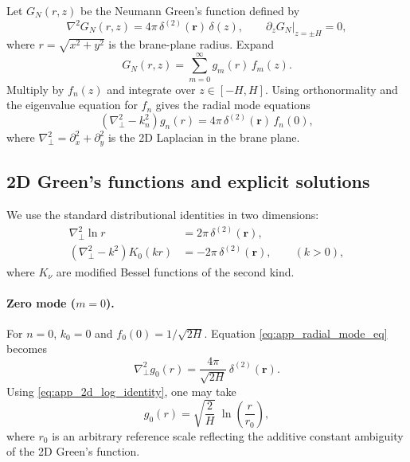 \documentclass[11pt]{article}
\begin{document}
Let $G_N(r,z)$ be the Neumann Green's function defined by
\begin{equation}
  \nabla^2 G_N(r,z) = 4\pi\,\delta^{(2)}(\mathbf{r})\,\delta(z),
  \qquad \partial_z G_N|_{z=\pm H}=0,
\end{equation}
where $r=\sqrt{x^2+y^2}$ is the brane-plane radius.
Expand
\begin{equation}
  G_N(r,z) = \sum_{m=0}^{\infty} g_m(r)\,f_m(z).
  \label{eq:app_G_expansion}
\end{equation}
Multiply by $f_n(z)$ and integrate over $z\in[-H,H]$. Using orthonormality and the eigenvalue
equation for $f_n$ gives the radial mode equations
\begin{equation}
  \left(\nabla_\perp^2 - k_n^2\right) g_n(r)
  = 4\pi\,\delta^{(2)}(\mathbf{r})\,f_n(0),
  \label{eq:app_radial_mode_eq}
\end{equation}
where $\nabla_\perp^2=\partial_x^2+\partial_y^2$ is the 2D Laplacian in the brane plane.

\subsection{2D Green's functions and explicit solutions}

We use the standard distributional identities in two dimensions:
\begin{align}
  \nabla_\perp^2 \ln r &= 2\pi\,\delta^{(2)}(\mathbf{r}),
  \label{eq:app_2d_log_identity}\\
  \left(\nabla_\perp^2 - k^2\right)K_0(k r) &= -2\pi\,\delta^{(2)}(\mathbf{r}),
  \qquad (k>0),
  \label{eq:app_2d_K0_identity}
\end{align}
where $K_\nu$ are modified Bessel functions of the second kind.

\paragraph{Zero mode ($m=0$).}
For $n=0$, $k_0=0$ and $f_0(0)=1/\sqrt{2H}$.  Equation \eqref{eq:app_radial_mode_eq} becomes
\begin{equation}
  \nabla_\perp^2 g_0(r) = \frac{4\pi}{\sqrt{2H}}\,\delta^{(2)}(\mathbf{r}).
\end{equation}
Using \eqref{eq:app_2d_log_identity}, one may take
\begin{equation}
  g_0(r) = \sqrt{\frac{2}{H}}\;\ln\!\left(\frac{r}{r_0}\right),
\end{equation}
where $r_0$ is an arbitrary reference scale reflecting the additive constant ambiguity of the 2D
Green's function.
\end{document}

